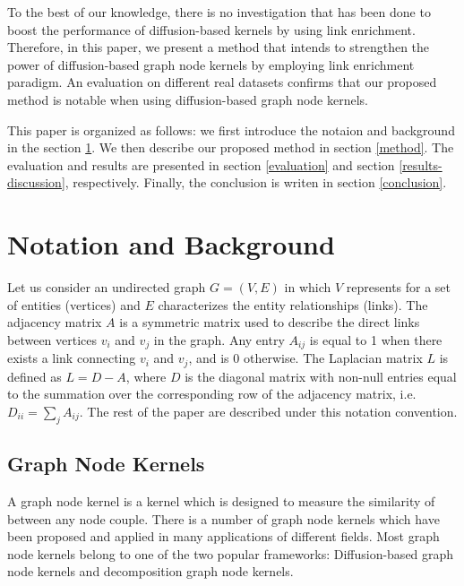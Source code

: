 \documentclass[runningheads,a4paper]{llncs}
\begin{document}
To the best of our knowledge, there is no investigation that has been done to boost the performance of diffusion-based kernels by using link enrichment. Therefore, in this paper, we present a method that intends to strengthen the power of diffusion-based graph node kernels by employing link enrichment paradigm. An evaluation on different real datasets confirms that our proposed method is notable when using diffusion-based graph node kernels.

This paper is organized as follows: we first introduce the notaion and background in the section \ref{background}. We then describe our proposed method in section \ref{method}. The evaluation and results are presented in section \ref{evaluation} and section \ref{results-discussion}, respectively. Finally, the conclusion is writen in section \ref{conclusion}.

\section{Notation and Background}
\label{background}
Let us consider an undirected graph $G = (V, E)$ in which $V$ represents for a set of entities (vertices)  and $E$ characterizes the entity relationships (links). The adjacency matrix $A$ is a symmetric matrix used to describe the direct links between vertices $v_{i}$ and $v_{j}$ in the graph. Any entry $A_{ij}$ is equal to 1 when there exists a link connecting $v_{i}$ and $v_{j}$, and is 0 otherwise. The Laplacian matrix $L$ is defined as $L = D-A$, where $D$ is the diagonal matrix with non-null entries equal to the summation over the corresponding row of the adjacency matrix, i.e. $D_{ii}=\sum_j A_{ij}$. The rest of the paper are described under this notation convention. 
\subsection{Graph Node Kernels}
A graph node kernel is a kernel which is designed to measure the similarity of between any node couple. There is a number of graph node kernels which have been proposed and applied in many applications of different fields. Most graph node kernels belong to one of the two popular frameworks: Diffusion-based graph node kernels and decomposition graph node kernels. 
\end{document}
